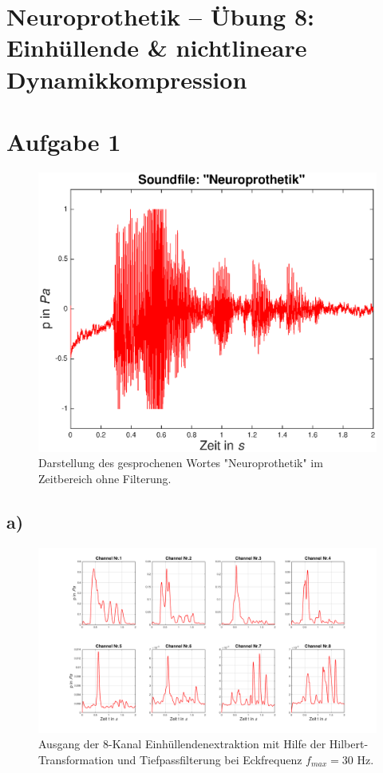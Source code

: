 \documentclass[
a4paper, 
12pt, 
]{article}
\begin{document}
	
	\thispagestyle{firstpage} 			%
	
	\section*{Neuroprothetik -- Übung 8: Einhüllende \& nichtlineare Dynamikkompression}
	\section*{Aufgabe 1}
	\begin{figure}[h]
\centering
\includegraphics[width=0.7\linewidth]{Plots/orig_sound}
\caption{Darstellung des gesprochenen Wortes "Neuroprothetik" im Zeitbereich ohne Filterung.}
\label{fig:orig_sound}
\end{figure}

\subsection*{a)}
\begin{figure}[h]
\centering
\includegraphics[width=1\linewidth]{Plots/a1_8ch}
\caption{Ausgang der 8-Kanal Einhüllendenextraktion mit Hilfe der Hilbert-Transformation und Tiefpassfilterung bei Eckfrequenz $f_{max}=30$ Hz.}
\label{fig:a1_8channels}
\end{figure}
\end{document}
